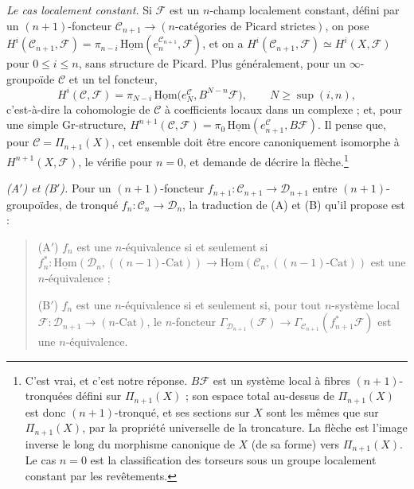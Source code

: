 \documentclass[11pt,a4paper]{article}
\begin{document}
\emph{Le cas localement constant.} Si $\mathcal{F}$ est un $n$-champ
localement constant, défini par un $(n+1)$-foncteur
$\mathcal{C}_{n+1} \to (n\text{-catégories de Picard strictes})$, on pose
$H^i(\mathcal{C}_{n+1},\mathcal{F}) = \pi_{n-i}\,
\underline{\mathrm{Hom}}(e^{\mathcal{C}_{n+1}}_n,\mathcal{F})$, et on a
$H^i(\mathcal{C}_{n+1},\mathcal{F}) \simeq H^i(X,\mathcal{F})$ pour
$0 \leqslant i \leqslant n$, sans structure de Picard. Plus généralement,
pour un $\infty$-groupoïde $\mathcal{C}$ et un tel foncteur,
\[
H^i(\mathcal{C},\mathcal{F}) = \pi_{N-i}\,\underline{\mathrm{Hom}}\bigl(e^{\mathcal{C}}_N, B^{N-n}\mathcal{F}\bigr), \qquad N \geqslant \sup(i,n),
\]
c'est-à-dire la cohomologie de $\mathcal{C}$ à coefficients locaux dans un
complexe ; et, pour une simple Gr-structure,
$H^{n+1}(\mathcal{C},\mathcal{F}) = \pi_0\,\underline{\mathrm{Hom}}(e^{\mathcal{C}}_{n+1},B\mathcal{F})$.
Il pense que, pour $\mathcal{C} = \Pi_{n+1}(X)$, cet ensemble doit être
encore canoniquement isomorphe à $H^{n+1}(X,\mathcal{F})$, le vérifie pour
$n = 0$, et demande de décrire la flèche.\footnote{C'est vrai, et c'est
notre réponse. $B\mathcal{F}$ est un système local à fibres
$(n+1)$-tronquées défini sur $\Pi_{n+1}(X)$ ; son espace total au-dessus de
$\Pi_{n+1}(X)$ est donc $(n+1)$-tronqué, et ses sections sur $X$ sont les
mêmes que sur $\Pi_{n+1}(X)$, par la propriété universelle de la troncature.
La flèche est l'image inverse le long du morphisme canonique de $X$ (de sa
forme) vers $\Pi_{n+1}(X)$. Le cas $n = 0$ est la classification des
torseurs sous un groupe localement constant par les revêtements.}

\emph{(A$'$) et (B$'$).} Pour un $(n+1)$-foncteur
$f_{n+1} : \mathcal{C}_{n+1} \to \mathcal{D}_{n+1}$ entre
$(n+1)$-groupoïdes, de tronqué $f_n : \mathcal{C}_n \to \mathcal{D}_n$, la
traduction de (A) et (B) qu'il propose est :

\begin{quote}
(A$'$) $f_n$ est une $n$-équivalence si et seulement si
$f_n^* : \underline{\mathrm{Hom}}(\mathcal{D}_n,((n-1)\text{-}\mathrm{Cat})) \to
\underline{\mathrm{Hom}}(\mathcal{C}_n,((n-1)\text{-}\mathrm{Cat}))$ est une
$n$-équivalence ;

(B$'$) $f_n$ est une $n$-équivalence si et seulement si, pour tout
$n$-système local $\mathcal{F} : \mathcal{D}_{n+1} \to (n\text{-}\mathrm{Cat})$,
le $n$-foncteur
$\Gamma_{\mathcal{D}_{n+1}}(\mathcal{F}) \to \Gamma_{\mathcal{C}_{n+1}}(f_{n+1}^*\mathcal{F})$
est une $n$-équivalence.
\end{quote}
\end{document}
